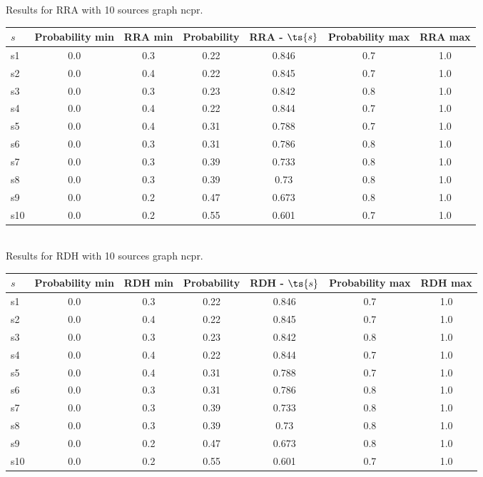 \documentclass{article}
\begin{document}
\noindent Results for RRA with 10 sources graph ncpr.

\noindent\begin{tabular}{|l|c|c|c|c|c|c|}
\hline
$s$& Probability min & RRA min & Probability & RRA - $\ts{s}$ & Probability max & RRA max\\
\hline
s1 &0.0 & 0.3 & 0.22 & 0.846 & 0.7 & 1.0\\
\hline
s2 &0.0 & 0.4 & 0.22 & 0.845 & 0.7 & 1.0\\
\hline
s3 &0.0 & 0.3 & 0.23 & 0.842 & 0.8 & 1.0\\
\hline
s4 &0.0 & 0.4 & 0.22 & 0.844 & 0.7 & 1.0\\
\hline
s5 &0.0 & 0.4 & 0.31 & 0.788 & 0.7 & 1.0\\
\hline
s6 &0.0 & 0.3 & 0.31 & 0.786 & 0.8 & 1.0\\
\hline
s7 &0.0 & 0.3 & 0.39 & 0.733 & 0.8 & 1.0\\
\hline
s8 &0.0 & 0.3 & 0.39 & 0.73 & 0.8 & 1.0\\
\hline
s9 &0.0 & 0.2 & 0.47 & 0.673 & 0.8 & 1.0\\
\hline
s10 &0.0 & 0.2 & 0.55 & 0.601 & 0.7 & 1.0\\
\hline
\end{tabular}\\

\noindent Results for RDH with 10 sources graph ncpr.

\noindent\begin{tabular}{|l|c|c|c|c|c|c|}
\hline
$s$& Probability min & RDH min & Probability & RDH - $\ts{s}$ & Probability max & RDH max\\
\hline
s1 &0.0 & 0.3 & 0.22 & 0.846 & 0.7 & 1.0\\
\hline
s2 &0.0 & 0.4 & 0.22 & 0.845 & 0.7 & 1.0\\
\hline
s3 &0.0 & 0.3 & 0.23 & 0.842 & 0.8 & 1.0\\
\hline
s4 &0.0 & 0.4 & 0.22 & 0.844 & 0.7 & 1.0\\
\hline
s5 &0.0 & 0.4 & 0.31 & 0.788 & 0.7 & 1.0\\
\hline
s6 &0.0 & 0.3 & 0.31 & 0.786 & 0.8 & 1.0\\
\hline
s7 &0.0 & 0.3 & 0.39 & 0.733 & 0.8 & 1.0\\
\hline
s8 &0.0 & 0.3 & 0.39 & 0.73 & 0.8 & 1.0\\
\hline
s9 &0.0 & 0.2 & 0.47 & 0.673 & 0.8 & 1.0\\
\hline
s10 &0.0 & 0.2 & 0.55 & 0.601 & 0.7 & 1.0\\
\hline
\end{tabular}\\
\end{document}
